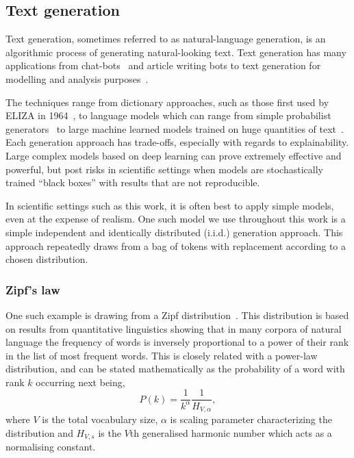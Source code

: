 \subsection{Text generation}\label{sec:textgeneration}

Text generation, sometimes referred to as natural-language generation, is an algorithmic process of generating natural-looking text. Text generation has many applications from chat-bots~\cite{MauldinChatterbots1994} and article writing bots to text generation for modelling and analysis purposes~\cite{Touseefsurvey2020}.

The techniques range from dictionary approaches, such as those first used by ELIZA in 1964~\cite{weizenbaum_computer_1976}, to language models which can range from simple probabilist generators~\cite{reiter2000building} to large machine learned models trained on huge quantities of text~\cite{perera2017recent}. Each generation approach has trade-offs, especially with regards to explainability. Large complex models based on deep learning can prove extremely effective and powerful, but post risks in scientific settings when models are stochastically trained ``black boxes'' with results that are not reproducible.

In scientific settings such as this work, it is often best to apply simple models, even at the expense of realism. One such model we use throughout this work is a simple independent and identically distributed (i.i.d.) generation approach. This approach repeatedly draws from a bag of tokens with replacement according to a chosen distribution. 

\subsubsection{Zipf's law}
One such example is drawing from a Zipf distribution~\cite{george1935zipf,zipf_human_1949}. This distribution is based on results from quantitative linguistics showing that in many corpora of natural language the frequency of words is inversely proportional to a power of their rank in the list of most frequent words. This is closely related with a power-law distribution, and can be stated mathematically as the probability of a word with rank $k$ occurring next being,
\begin{equation}
P(k) = \frac{1}{k^\alpha}\frac{1}{H_{V,\alpha}},
\end{equation}
where $V$ is the total vocabulary size, $\alpha$ is scaling parameter characterizing the distribution and $H_{V,s}$ is the $V$th generalised harmonic number which acts as a normalising constant. 

